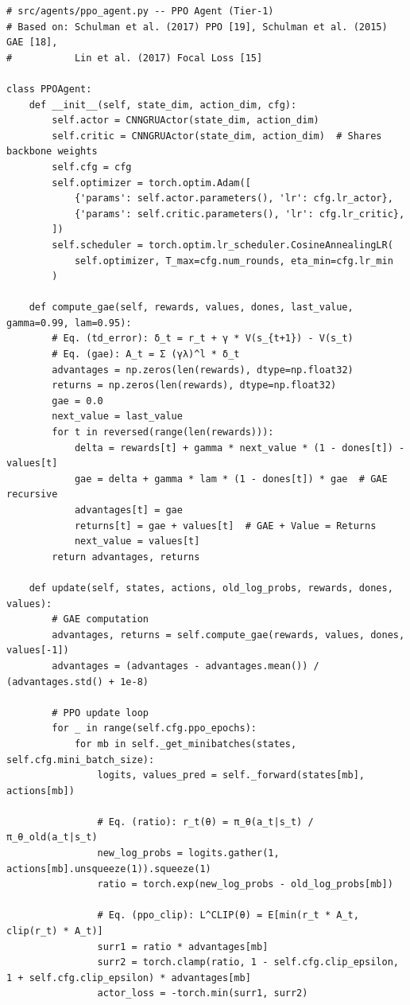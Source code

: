 \documentclass[12pt,a4paper]{article}
\begin{document}
\begin{lstlisting}[caption=PPO Agent Implementation with GAE and Focal Loss, label=lst:ppo_agent]
# src/agents/ppo_agent.py -- PPO Agent (Tier-1)
# Based on: Schulman et al. (2017) PPO [19], Schulman et al. (2015) GAE [18],
#           Lin et al. (2017) Focal Loss [15]

class PPOAgent:
    def __init__(self, state_dim, action_dim, cfg):
        self.actor = CNNGRUActor(state_dim, action_dim)
        self.critic = CNNGRUActor(state_dim, action_dim)  # Shares backbone weights
        self.cfg = cfg
        self.optimizer = torch.optim.Adam([
            {'params': self.actor.parameters(), 'lr': cfg.lr_actor},
            {'params': self.critic.parameters(), 'lr': cfg.lr_critic},
        ])
        self.scheduler = torch.optim.lr_scheduler.CosineAnnealingLR(
            self.optimizer, T_max=cfg.num_rounds, eta_min=cfg.lr_min
        )

    def compute_gae(self, rewards, values, dones, last_value, gamma=0.99, lam=0.95):
        # Eq. (td_error): δ_t = r_t + γ * V(s_{t+1}) - V(s_t)
        # Eq. (gae): A_t = Σ (γλ)^l * δ_t
        advantages = np.zeros(len(rewards), dtype=np.float32)
        returns = np.zeros(len(rewards), dtype=np.float32)
        gae = 0.0
        next_value = last_value
        for t in reversed(range(len(rewards))):
            delta = rewards[t] + gamma * next_value * (1 - dones[t]) - values[t]
            gae = delta + gamma * lam * (1 - dones[t]) * gae  # GAE recursive
            advantages[t] = gae
            returns[t] = gae + values[t]  # GAE + Value = Returns
            next_value = values[t]
        return advantages, returns

    def update(self, states, actions, old_log_probs, rewards, dones, values):
        # GAE computation
        advantages, returns = self.compute_gae(rewards, values, dones, values[-1])
        advantages = (advantages - advantages.mean()) / (advantages.std() + 1e-8)

        # PPO update loop
        for _ in range(self.cfg.ppo_epochs):
            for mb in self._get_minibatches(states, self.cfg.mini_batch_size):
                logits, values_pred = self._forward(states[mb], actions[mb])

                # Eq. (ratio): r_t(θ) = π_θ(a_t|s_t) / π_θ_old(a_t|s_t)
                new_log_probs = logits.gather(1, actions[mb].unsqueeze(1)).squeeze(1)
                ratio = torch.exp(new_log_probs - old_log_probs[mb])

                # Eq. (ppo_clip): L^CLIP(θ) = E[min(r_t * A_t, clip(r_t) * A_t)]
                surr1 = ratio * advantages[mb]
                surr2 = torch.clamp(ratio, 1 - self.cfg.clip_epsilon, 1 + self.cfg.clip_epsilon) * advantages[mb]
                actor_loss = -torch.min(surr1, surr2)


\end{lstlisting}
\end{document}
